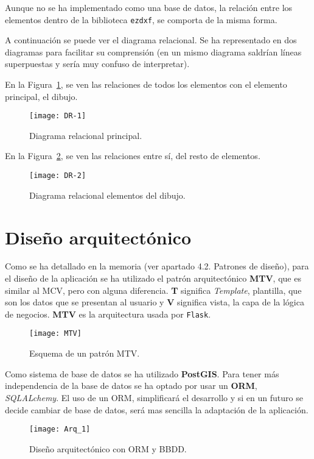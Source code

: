 Aunque no se ha implementado como una base de datos, la relación entre los elementos dentro de la biblioteca \texttt{ezdxf}, se comporta de la misma forma.

A continuación se puede ver el diagrama relacional. Se ha representado en dos diagramas para facilitar su comprensión (en un mismo diagrama saldrían líneas superpuestas y sería muy confuso de interpretar).

En la Figura~\ref{fig:DR-1}, se ven las relaciones de todos los elementos con el elemento principal, el dibujo.

\begin{figure}[H]
	\centering
	\texttt{[image: DR-1]}
	\caption{Diagrama relacional principal.}
	\label{fig:DR-1}
\end{figure}

En la Figura~\ref{fig:DR-2}, se ven las relaciones entre sí, del resto de elementos.

\begin{figure}[H]
	\centering
	\texttt{[image: DR-2]}
	\caption{Diagrama relacional elementos del dibujo.}
	\label{fig:DR-2}
\end{figure}

\section{Diseño arquitectónico}

Como se ha detallado en la memoria (ver apartado 4.2. Patrones de diseño), para el diseño de la aplicación se ha utilizado el patrón arquitectónico \textbf{MTV}, que es similar al MCV, pero con alguna diferencia. \textbf{T} significa \emph{Template}, plantilla, que son los datos que se presentan al usuario y \textbf{V} significa vista, la capa de la lógica de negocios.
\textbf{MTV} es la arquitectura usada por \texttt{Flask}. 


\begin{figure}[H]
	\centering
	\texttt{[image: MTV]}
	\caption{Esquema de un patrón MTV.}
	\label{fig:MTV}
\end{figure}
Como sistema de base de datos se ha utilizado \textbf{PostGIS}. Para tener más independencia de la base de datos se ha optado por usar un \textbf{ORM}, \emph{SQLALchemy}. El uso de un ORM,  simplificará el desarrollo y si en un futuro se decide cambiar de base de datos, será mas sencilla la adaptación de la aplicación.


\begin{figure}[H]
	\centering
	\texttt{[image: Arq\_1]}
	\caption{Diseño arquitectónico con ORM y BBDD.}
	\label{fig:Arq_1}
\end{figure}

